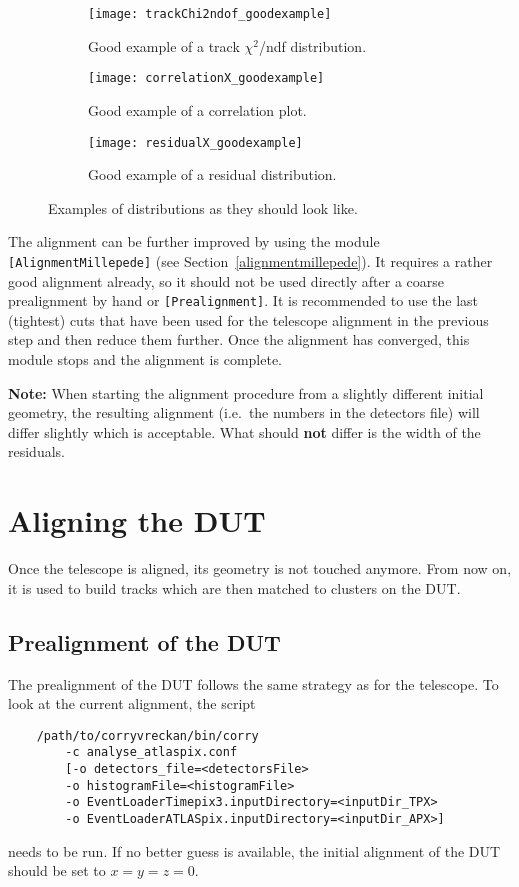 \begin{figure}
    \centering
    \begin{subfigure}[t]{0.66\textwidth}
        \texttt{[image: trackChi2ndof\_goodexample]}
        \caption{Good example of a track $\chi^2$/ndf distribution.}
        \label{fig:trackChi2}
    \end{subfigure}
    \begin{subfigure}[t]{0.66\textwidth}
        \texttt{[image: correlationX\_goodexample]}
        \caption{Good example of a correlation plot.}
        \label{fig:correlationX}
    \end{subfigure}
    \begin{subfigure}[t]{0.66\textwidth}
        \texttt{[image: residualX\_goodexample]}
        \caption{Good example of a residual distribution.}
        \label{fig:residualX}
    \end{subfigure}
    \caption{Examples of distributions as they should look like.}
    \label{fig:exampleAlignment}
\end{figure}

The alignment can be further improved by using the module \texttt{[AlignmentMillepede]} (see Section~\ref{alignmentmillepede}).
It requires a rather good alignment already, so it should not be used directly after a coarse prealignment by hand or \texttt{[Prealignment]}.
It is recommended to use the last (tightest) cuts that have been used for the telescope alignment in the previous step and then reduce them further.
Once the alignment has converged, this module stops and the alignment is complete.

\textbf{Note:} When starting the alignment procedure from a slightly different initial geometry, the resulting alignment (i.e.~the numbers in the detectors file) will differ slightly which is acceptable. What should \textbf{not} differ is the width of the residuals.

\section{Aligning the DUT}
\label{sec:align_dut}
Once the telescope is aligned, its geometry is not touched anymore. From now on, it is used to build tracks which are then matched to clusters on the DUT.

\subsection*{Prealignment of the DUT}
The prealignment of the DUT follows the same strategy as for the telescope. To look at the current alignment, the script
\begin{verbatim}
    /path/to/corryvreckan/bin/corry 
    	-c analyse_atlaspix.conf 
    	[-o detectors_file=<detectorsFile> 
    	-o histogramFile=<histogramFile> 
    	-o EventLoaderTimepix3.inputDirectory=<inputDir_TPX>
    	-o EventLoaderATLASpix.inputDirectory=<inputDir_APX>]
\end{verbatim}
needs to be run.
If no better guess is available, the initial alignment of the DUT should be set to $x=y=z=0$.

